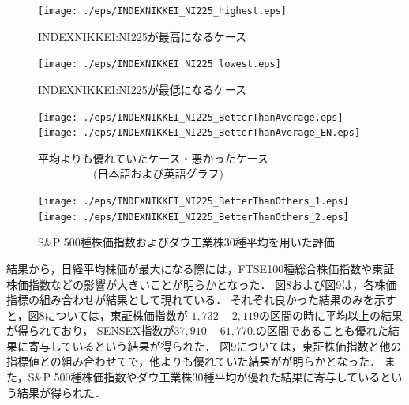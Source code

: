 \documentclass[submit,techrep,noauthor]{ipsj}
\begin{document}
\begin{figure}[h]
\begin{center}
\label{tableauinsight1}
\texttt{[image: ./eps/INDEXNIKKEI\_NI225\_highest.eps]}
\caption{INDEXNIKKEI:NI225が最高になるケース}
\end{center}
\end{figure}

\begin{figure}[h]
\begin{center}
\label{tableauinsight2}
\texttt{[image: ./eps/INDEXNIKKEI\_NI225\_lowest.eps]}
\caption{INDEXNIKKEI:NI225が最低になるケース}
\end{center}
\end{figure}

\begin{figure}[h]
\begin{center}
\label{tableauinsight3}
\texttt{[image: ./eps/INDEXNIKKEI\_NI225\_BetterThanAverage.eps]}
\texttt{[image: ./eps/INDEXNIKKEI\_NI225\_BetterThanAverage\_EN.eps]}
\vspace{-2mm}
\caption{平均よりも優れていたケース・悪かったケース\\　　　　　(日本語および英語グラフ)}
\vspace{-2mm}
\end{center}
\end{figure}

\begin{figure}[h]
\begin{center}
\label{tableauinsight4}
\texttt{[image: ./eps/INDEXNIKKEI\_NI225\_BetterThanOthers\_1.eps]}
\texttt{[image: ./eps/INDEXNIKKEI\_NI225\_BetterThanOthers\_2.eps]}
\caption{S\&P 500種株価指数およびダウ工業株30種平均を用いた評価}
\vspace{-2mm}
\end{center}
\end{figure}

結果から，日経平均株価が最大になる際には，FTSE100種総合株価指数や東証株価指数などの影響が大きいことが明らかとなった．
%
図8および図9は，各株価指標の組み合わせが結果として現れている．
それぞれ良かった結果のみを示すと，図8については，東証株価指数が
$1,732-2,119$の区間の時に平均以上の結果が得られており，
SENSEX指数が$37,910-61,770.$の区間であることも優れた結果に寄与しているという結果が得られた．
%
図9については，東証株価指数と他の指標値との組み合わせてで，他よりも優れていた結果がが明らかとなった．
また，S\&P 500種株価指数やダウ工業株30種平均が優れた結果に寄与しているという結果が得られた．
\end{document}
